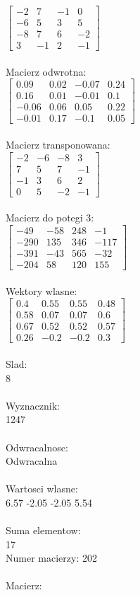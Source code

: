 \documentclass[a4paper,12pt]{article}
\begin{document}
$\begin{bmatrix} -2&7&-1&0\\-6&5&3&5\\-8&7&6&-2\\3&-1&2&-1 \end{bmatrix}$
\\
\\
Macierz odwrotna:\\

$\begin{bmatrix} 0.09&0.02&-0.07&0.24\\0.16&0.01&-0.01&0.1\\-0.06&0.06&0.05&0.22\\-0.01&0.17&-0.1&0.05 \end{bmatrix}$
\\
\\
Macierz transponowana:\\

$\begin{bmatrix} -2&-6&-8&3\\7&5&7&-1\\-1&3&6&2\\0&5&-2&-1 \end{bmatrix}$
\\
\\
Macierz do potegi 3:\\

$\begin{bmatrix} -49&-58&248&-1\\-290&135&346&-117\\-391&-43&565&-32\\-204&58&120&155 \end{bmatrix}$
\\
\\
Wektory wlasne:\\

$\begin{bmatrix} 0.4&0.55&0.55&0.48\\0.58&0.07&0.07&0.6\\0.67&0.52&0.52&0.57\\0.26&-0.2&-0.2&0.3 \end{bmatrix}$
\\
\\
Slad:\\
8
\\
\\
Wyznacznik:\\
1247
\\
\\
Odwracalnosc:\\
Odwracalna
\\
\\
Wartosci wlasne:\\
6.57 -2.05 -2.05 5.54
\\
\\
Suma elementow:\\
17
\\
\newpage
Numer macierzy:
202
\\
\\
Macierz:\\
\end{document}
